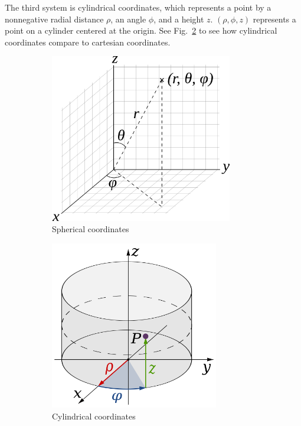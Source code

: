 \documentclass{article}
\begin{document}
\begin{enumerate}
The third system is cylindrical coordinates, which represents a point by a nonnegative radial distance $\rho$, an angle $\phi$, and a height $z$.  $(\rho, \phi, z)$ represents a point on a cylinder centered at the origin.  See Fig.~\ref{fig:cylindrical_coords} to see how cylindrical coordinates compare to cartesian coordinates.

\begin{figure}[h!!!]
        \centering
	\begin{subfigure}[b]{0.48\textwidth}
	\centering
	\includegraphics[height=2.9in]{"./figures/spherical"}
	\caption{Spherical coordinates}
	\label{fig:spherical_coords}
	\end{subfigure}
        \quad%
	\begin{subfigure}[b]{0.48\textwidth}
	\centering
	\includegraphics[height=2.9in]{"./figures/cylindrical"}
	\caption{Cylindrical coordinates}
	\label{fig:cylindrical_coords}
	\end{subfigure}
	 \caption{}\label{fig:coord_systems}
\end{figure}


\end{enumerate}
\end{document}
